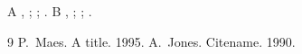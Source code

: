 \documentclass{article}
\begin{document}
A \citep{maes}, \citet{maes}; \citeauthor{maes}; \citeyear{maes}. B \citep{cn}, \citet{cn}; \citeauthor{cn};
\citeyear{cn}.
\begin{thebibliography}{9}
 P.~Maes. A title. 1995.
 A.~Jones. Citename. 1990.
\end{thebibliography}
\end{document}
